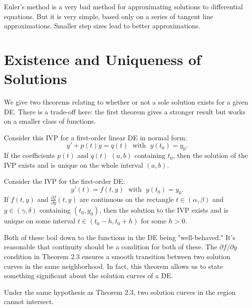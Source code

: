 \documentclass[../m082main.tex]{subfiles}
\begin{document}
Euler's method is a very bad method for approximating solutions to differential equations.
But it is very simple, based only on a series of tangent line approximations.
Smaller step sizes lead to better approximations.

\section{Existence and Uniqueness of Solutions}
We give two theorems relating to whether or not a sole solution exists for a given DE.
There is a trade-off here: the first theorem gives a stronger result but works on a smaller class of functions.

\begin{theorem}
    Consider this IVP for a first-order linear DE in normal form:
    \[ y' + p(t)y = q(t) \;\text{ with }\; y(t_0) = y_0. \]
    If the coefficients $p(t)$ and $q(t)$  $(a, b)$ containing $t_0$, then the solution of the IVP exists and is unique on the whole interval $(a, b)$.
\end{theorem}

\begin{theorem}
    Consider the IVP for the first-order DE:
    \[ y'(t) = f(t, y) \;\text{ with }\; y(t_0) = y_0. \]
    If $f(t, y)$ and $\frac{\partial f}{\partial y}(t, y)$ are continuous on the rectangle $t \in (\alpha, \beta)$ and $y \in (\gamma, \delta)$ containing $(t_0, y_0)$, then the solution to the IVP exists and is unique on some interval $t \in (t_0 - h, t_0 + h)$ for some $h > 0$.
\end{theorem}

Both of these boil down to the functions in the DE being "well-behaved."
It's reasonable that continuity should be a condition for both of these.
The $\partial f / \partial y$ condition in Theorem 2.3 ensures a smooth transition between two solution curves in the same neighborhood.
In fact, this theorem allows us to state something significant about the solution curves of a DE.

\begin{corollary}
    Under the same hypothesis as Theorem 2.3, two solution curves in the region cannot intersect.
\end{corollary}
\end{document}
